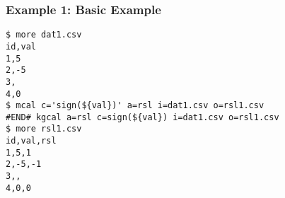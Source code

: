 \subsubsection*{Example 1: Basic Example}



\begin{Verbatim}[baselinestretch=0.7,frame=single]
$ more dat1.csv
id,val
1,5
2,-5
3,
4,0
$ mcal c='sign(${val})' a=rsl i=dat1.csv o=rsl1.csv
#END# kgcal a=rsl c=sign(${val}) i=dat1.csv o=rsl1.csv
$ more rsl1.csv
id,val,rsl
1,5,1
2,-5,-1
3,,
4,0,0
\end{Verbatim}

